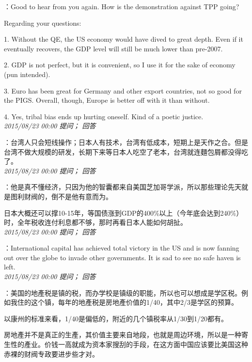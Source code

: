 \documentclass[twocolumn]{ctexart}
\begin{document}
：Good to hear from you again. How is the demonstration against TPP going?

Regarding your questions:

1. Without the QE, the US economy would have dived to great depth. Even if it eventually recovers, the GDP level will still be much lower than pre-2007.

2. GDP is not perfect, but it is convenient, so I use it for the sake of economy (pun intended).

3. Euro has been great for Germany and other export countries, not so good for the PIGS. Overall, though, Europe is better off with it than without.

4. Yes, tribal bias ends up hurting oneself. Kind of a poetic justice.\\

\textit{\hfill\noindent\small 2015/08/23 00:00 提问； 回答}

：台湾人只会短线操作；日本人有技术，台湾有低成本，短期上是天作之合。但是台湾不做大规模的研发，长期下来等日本人吃空了老本，台湾就连麵包屑都没得吃了。\\

\textit{\hfill\noindent\small 2015/08/23 00:00 提问； 回答}

：他是真不懂经济，只因为他的智囊都来自美国芝加哥学派，所以那些理论先天就是图利财阀的，倒不是他有意而为。

日本大概还可以撑10-15年，等国债涨到GDP的400\%以上（今年底会达到240\%）时，全年税收连付利息都不够，那时再看日本人能如何胡扯。\\

\textit{\hfill\noindent\small 2015/08/23 00:00 提问； 回答}

：International capital has achieved total victory in the US and is now fanning out over the globe to invade other governments. It is sad to see no safe haven is left.\\

\textit{\hfill\noindent\small 2015/08/23 00:00 提问； 回答}

：美国的地產税是镇的税，而办学校是镇级的职能，所以也可以想成是学区税。例如我住的这个镇，每年的地產税是房地產价值的1/40，其中2/3是学区的预算。

以康州的标准来看，1/40是偏低的，附近的几个镇税率从1/30到1/20都有。

房地產并不是真正的生產，其价值主要来自地段，也就是周边环境，所以是一种寄生性的產业。价钱一高就成为资本家搜刮的手段，在这方面中国应该要比美国这种赤裸的财阀专政要进步些才对。\\
\end{document}
